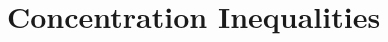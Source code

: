 \documentclass[../main]{subfiles}
\begin{document}
\chapter{Concentration Inequalities}
\end{document}
